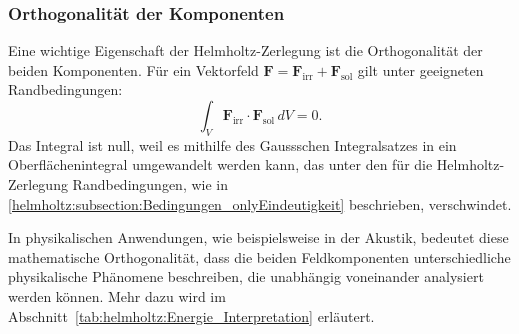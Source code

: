 \subsubsection{Orthogonalität der Komponenten}

Eine wichtige Eigenschaft der Helmholtz-Zerlegung ist die Orthogonalität der beiden Komponenten.
Für ein Vektorfeld $\boldsymbol{F} = \boldsymbol{F}_{\text{irr}} + \boldsymbol{F}_{\text{sol}}$ gilt unter geeigneten Randbedingungen:
\begin{equation}
\int_V \boldsymbol{F}_{\text{irr}} \cdot \boldsymbol{F}_{\text{sol}} \, dV = 0.
\end{equation}
%
%
Das Integral ist null, weil es mithilfe des Gaussschen Integralsatzes
in ein Oberflächenintegral umgewandelt werden kann, das unter den
für die Helmholtz-Zerlegung Randbedingungen, wie in
\ref{helmholtz:subsection:Bedingungen_onlyEindeutigkeit} beschrieben,
verschwindet.
 
In physikalischen Anwendungen, wie beispielsweise in der Akustik,
bedeutet diese mathematische Orthogonalität, dass die beiden
Feldkomponenten unterschiedliche physikalische Phänomene beschreiben,
die unabhängig voneinander analysiert werden können.
Mehr dazu wird im Abschnitt~\ref{tab:helmholtz:Energie_Interpretation}
erläutert.


